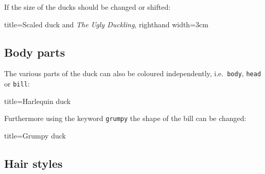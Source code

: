 \documentclass[parskip=half]{scrartcl}
\begin{document}
\clearpage
If the size of the ducks should be changed or shifted:

\begin{tcblisting}{title={Scaled duck and \emph{The Ugly Duckling}},	righthand width=3cm}
\begin{tikzpicture}[scale=0.6]
	\duck
	\begin{scope}[xshift=90pt, scale=.3, yshift=150pt]
		\duck
	\end{scope}
	\begin{scope}[xshift=60pt, scale=.3, yshift=100pt]
		\duck
	\end{scope}
	\begin{scope}[xshift=80pt, scale=.3, yshift=50pt]
		\duck[body=gray!50!white,head=gray!50!white]
	\end{scope}		
\end{tikzpicture}
\end{tcblisting}

\subsection{Body parts}

The various parts of the duck can also be coloured independently, i.e.\ \lstinline|body|, \lstinline|head| or \lstinline|bill|:

\begin{tcblisting}{title={Harlequin duck}}
\begin{tikzpicture}
	\duck[body=yellow,
		head=yellow!50!orange, 
		bill=red,
		eye=green]
\end{tikzpicture}
\end{tcblisting}

Furthermore using the keyword \lstinline|grumpy| the shape of the bill can be changed:

\begin{tcblisting}{title={Grumpy duck}}
\begin{tikzpicture}
	\duck[grumpy]
\end{tikzpicture}
\begin{tikzpicture}
	\duck[grumpy, bill=cyan]
\end{tikzpicture}
\end{tcblisting}

\clearpage
\subsection{Hair styles}
\end{document}
